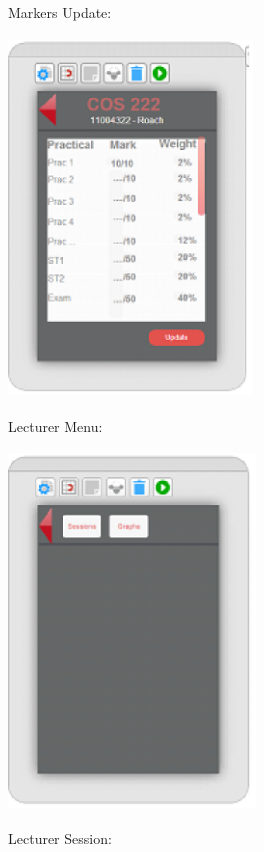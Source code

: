 \documentclass{article}
\begin{document}
Markers Update:

\includegraphics*[width=2.55in, height=3.77in, keepaspectratio=false]{image28}





Lecturer Menu:

\includegraphics*[width=2.58in, height=3.75in, keepaspectratio=false]{image29}









Lecturer Session:
\end{document}
